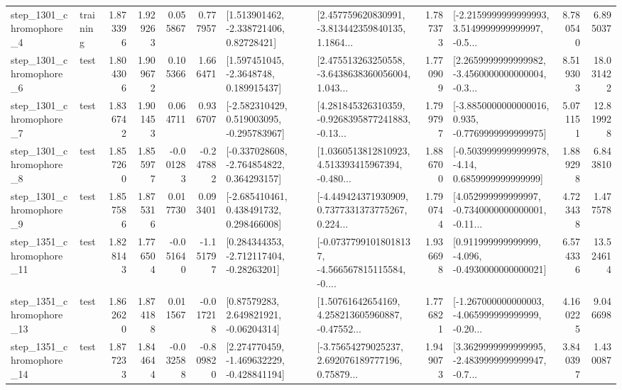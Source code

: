 \begin{tabular}{llrrrrllrlrr}
  step\_1301\_chromophore\_4 &  training &      1.873396 &    1.929263 &      0.055867 &  0.777957 &     [1.513901462, -2.338721406, 0.82728421] &  [2.457759620830991, -3.813442359840135, 1.1864... &       1.787373 &  [-2.2159999999999993, 3.5149999999999997, -0.5... &            8.780540 &          6.895037 \\
  step\_1301\_chromophore\_6 &      test &      1.804306 &    1.909672 &      0.105366 &  1.666471 &      [1.597451045, -2.3648748, 0.189915437] &  [2.475513263250558, -3.6438638360056004, 1.043... &       1.770909 &  [2.2659999999999982, -3.4560000000000004, -0.3... &            8.519303 &         18.031422 \\
  step\_1301\_chromophore\_7 &      test &      1.836742 &    1.901453 &      0.064711 &  0.936707 &   [-2.582310429, 0.519003095, -0.295783967] &  [4.281845326310359, -0.9268395877241883, -0.13... &       1.799797 &  [-3.8850000000000016, 0.935, -0.7769999999999975] &            5.071151 &         12.819928 \\
  step\_1301\_chromophore\_8 &      test &      1.857260 &    1.855977 &     -0.001283 & -0.247882 &   [-0.337028608, -2.764854822, 0.364293157] &  [1.0360513812810923, 4.513393415967394, -0.480... &       1.886700 &   [-0.5039999999999978, -4.14, 0.6859999999999999] &            1.889298 &          6.843810 \\
  step\_1301\_chromophore\_9 &      test &      1.857586 &    1.875316 &      0.017730 &  0.093401 &    [-2.685410461, 0.438491732, 0.298466008] &  [-4.449424371930909, 0.7377331373775267, 0.224... &       1.790744 &  [4.052999999999997, -0.7340000000000001, -0.11... &            4.723438 &          1.477578 \\
 step\_1351\_chromophore\_11 &      test &      1.828143 &    1.776504 &     -0.051640 & -1.151797 &    [0.284344353, -2.712117404, -0.28263201] &  [-0.07377991018018137, -4.566567815115584, -0.... &       1.936698 &   [0.911999999999999, -4.096, -0.4930000000000021] &            6.574336 &         13.524614 \\
 step\_1351\_chromophore\_13 &      test &      1.862620 &    1.874188 &      0.011567 & -0.017218 &      [0.87579283, 2.649821921, -0.06204314] &  [1.50761642654169, 4.258213605960887, -0.47552... &       1.776821 &  [-1.267000000000003, -4.065999999999999, -0.20... &            4.160225 &          9.046698 \\
 step\_1351\_chromophore\_14 &      test &      1.877233 &    1.844644 &     -0.032588 & -0.809820 &   [2.274770459, -1.469632229, -0.428841194] &  [-3.75654279025237, 2.692076189777196, 0.75879... &       1.949073 &  [3.3629999999999995, -2.4839999999999947, -0.7... &            3.840397 &          1.430087 \\

\end{tabular}
